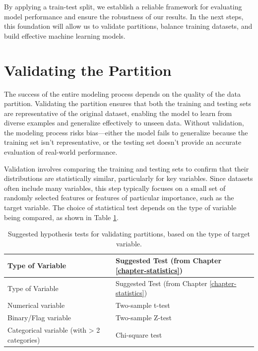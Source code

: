 \documentclass[
]{book}
\theoremstyle{definition}
\theoremstyle{definition}
\theoremstyle{definition}
\theoremstyle{definition}
\theoremstyle{remark}
\begin{document}
By applying a train-test split, we establish a reliable framework for evaluating model performance and ensure the robustness of our results. In the next steps, this foundation will allow us to validate partitions, balance training datasets, and build effective machine learning models.

\section{Validating the Partition}\label{sec-validate-partition}

The success of the entire modeling process depends on the quality of the data partition. Validating the partition ensures that both the training and testing sets are representative of the original dataset, enabling the model to learn from diverse examples and generalize effectively to unseen data. Without validation, the modeling process risks bias---either the model fails to generalize because the training set isn't representative, or the testing set doesn't provide an accurate evaluation of real-world performance.

Validation involves comparing the training and testing sets to confirm that their distributions are statistically similar, particularly for key variables. Since datasets often include many variables, this step typically focuses on a small set of randomly selected features or features of particular importance, such as the target variable. The choice of statistical test depends on the type of variable being compared, as shown in Table \ref{tab:partition-test}.

\begin{longtable}[]{@{}
  >{\raggedright\arraybackslash}p{}
  >{\raggedright\arraybackslash}p{}@{}}
\caption{\label{tab:partition-test} Suggested hypothesis tests for validating partitions, based on the type of target variable.}\tabularnewline
\toprule\noalign{}
\begin{minipage}[b]{\linewidth}\raggedright
Type of Variable
\end{minipage} & \begin{minipage}[b]{\linewidth}\raggedright
Suggested Test (from Chapter \ref{chapter-statistics})
\end{minipage} \\
\midrule\noalign{}
\endfirsthead
\toprule\noalign{}
\begin{minipage}[b]{\linewidth}\raggedright
Type of Variable
\end{minipage} & \begin{minipage}[b]{\linewidth}\raggedright
Suggested Test (from Chapter \ref{chapter-statistics})
\end{minipage} \\
\midrule\noalign{}
\endhead
\bottomrule\noalign{}
\endlastfoot
Numerical variable & Two-sample t-test \\
Binary/Flag variable & Two-sample Z-test \\
Categorical variable (with \textgreater{} 2 categories) & Chi-square test \\
\end{longtable}
\end{document}
